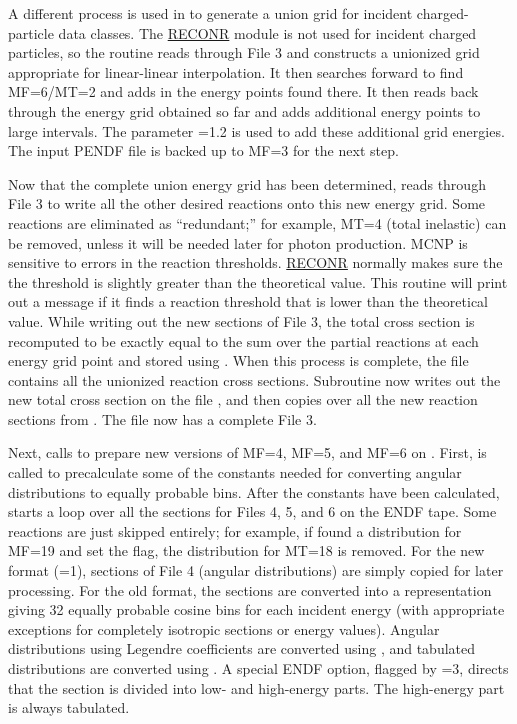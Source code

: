 A different process is used in  to generate a union
grid for incident charged-particle data classes.  The
\hyperlink{sRECONRhy}{RECONR}
module is not used for incident charged particles, so the routine
reads through File 3 and constructs a unionized grid appropriate
for linear-linear interpolation.  It then searches forward to find
MF=6/MT=2 and adds in the energy points found there.  It then reads
back through the energy grid obtained so far and adds additional
energy points to large intervals.  The parameter =1.2
is used to add these additional grid energies.  The input PENDF
file is backed up to MF=3 for the next step.

Now that the complete union energy grid has been determined,
 reads through File 3 to write all the other
desired reactions onto this new energy grid.  Some reactions are
eliminated as ``redundant;'' for example, MT=4 (total inelastic)
can be removed, unless it will be needed later for photon
production.  MCNP is sensitive to errors in the reaction
thresholds.  \hyperlink{sRECONRhy}{RECONR}
normally makes sure the the threshold
is slightly greater than the theoretical value.  This routine will
print out a message if it finds a reaction threshold that is
lower than the theoretical value.  While writing out the new
sections of File 3, the total cross section is recomputed to be
exactly equal to the sum over the partial reactions at each energy
grid point and stored using .  When this
process is complete, the file  contains all the
unionized reaction cross sections.  Subroutine  now
writes out the new total cross section on the file ,
and then copies over all the new reaction sections from .
The file  now has a complete File 3.

Next,  calls 
to prepare new versions of MF=4, MF=5, and MF=6 on .
First,  is called to precalculate some of the
constants needed for converting angular distributions to
equally probable bins.  After the constants have been
calculated,  starts a loop over all the
sections for Files 4, 5, and 6 on the ENDF tape.  Some reactions
are just skipped entirely; for example, if  found
a distribution for MF=19 and set the  flag, the
distribution for MT=18 is removed.  For the new format
(=1), sections of File 4 (angular distributions) are
simply copied for later processing.  For the old format, the
sections are converted into a representation giving 32 equally
probable cosine bins for each incident energy (with appropriate
exceptions for completely isotropic sections or energy values).
Angular distributions using Legendre coefficients are converted
using , and tabulated
distributions are converted using .
A special ENDF option, flagged by =3, directs that the
section is divided into low- and high-energy parts.  The high-energy
part is always tabulated.

